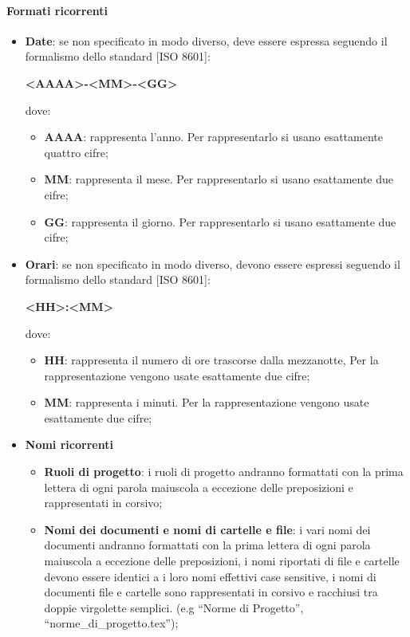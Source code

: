 			\paragraph{Formati ricorrenti}
				\begin{itemize}
					\item\textbf{Date}: se non specificato in modo diverso, deve essere espressa seguendo il formalismo dello standard [ISO 8601]:\\
						\begin{center}
							\textbf{<AAAA>-<MM>-<GG>}
						\end{center}
						dove:\\
						\begin{itemize}
							\item\textbf{AAAA}: rappresenta l’anno. Per rappresentarlo si usano esattamente quattro cifre;
							\item\textbf{MM}: rappresenta il mese. Per rappresentarlo si usano esattamente due cifre;
							\item\textbf{GG}: rappresenta il giorno. Per rappresentarlo si usano esattamente due cifre;
						\end{itemize}
					\item\textbf{Orari}:  se non specificato in modo diverso, devono essere espressi seguendo il formalismo dello standard [ISO 8601]:\\
						\begin{center}
							\textbf{<HH>:<MM>}
						\end{center}
						dove:\\
						\begin{itemize}
							\item\textbf{HH}: rappresenta il numero di ore trascorse dalla mezzanotte, Per la rappresentazione vengono usate esattamente due cifre;
							\item\textbf{MM}: rappresenta i minuti. Per la rappresentazione vengono usate esattamente due cifre;
						\end{itemize}
					\item\textbf{Nomi ricorrenti}\\
						\begin{itemize}
							\item\textbf{Ruoli di progetto}: i ruoli di progetto andranno formattati con la prima lettera di ogni parola maiuscola a eccezione delle preposizioni e rappresentati in corsivo;
							\item\textbf{Nomi dei documenti e nomi di cartelle e file}: i vari nomi dei documenti andranno formattati con la prima lettera di ogni parola maiuscola a eccezione delle preposizioni, i nomi riportati di file e cartelle devono essere identici a i loro nomi effettivi case sensitive, i nomi di documenti file e cartelle sono rappresentati in corsivo e racchiusi tra doppie virgolette semplici. (e.g “Norme di Progetto”, “norme\_di\_progetto.tex”);

\end{itemize}
\end{itemize}
